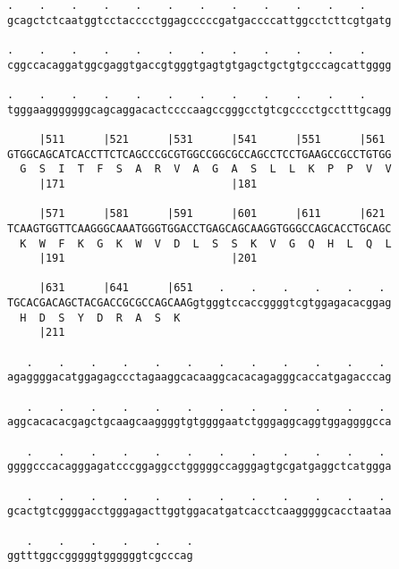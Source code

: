 \documentclass{article}
\begin{document}
\begin{Verbatim}
.    .    .    .    .    .    .    .    .    .    .    .    
gcagctctcaatggtcctacccctggagcccccgatgaccccattggcctcttcgtgatg
                                                            
.    .    .    .    .    .    .    .    .    .    .    .    
cggccacaggatggcgaggtgaccgtgggtgagtgtgagctgctgtgcccagcattgggg
                                                            
.    .    .    .    .    .    .    .    .    .    .    .    
tgggaagggggggcagcaggacactccccaagccgggcctgtcgcccctgcctttgcagg
                                                            
     |511      |521      |531      |541      |551      |561 
GTGGCAGCATCACCTTCTCAGCCCGCGTGGCCGGCGCCAGCCTCCTGAAGCCGCCTGTGG
  G  S  I  T  F  S  A  R  V  A  G  A  S  L  L  K  P  P  V  V
     |171                          |181                     
  
     |571      |581      |591      |601      |611      |621 
TCAAGTGGTTCAAGGGCAAATGGGTGGACCTGAGCAGCAAGGTGGGCCAGCACCTGCAGC
  K  W  F  K  G  K  W  V  D  L  S  S  K  V  G  Q  H  L  Q  L
     |191                          |201                     
  
     |631      |641      |651    .    .    .    .    .    . 
TGCACGACAGCTACGACCGCGCCAGCAAGgtgggtccaccggggtcgtggagacacggag
  H  D  S  Y  D  R  A  S  K                                 
     |211                                                   
  
   .    .    .    .    .    .    .    .    .    .    .    . 
agaggggacatggagagccctagaaggcacaaggcacacagagggcaccatgagacccag
                                                            
   .    .    .    .    .    .    .    .    .    .    .    . 
aggcacacacgagctgcaagcaaggggtgtggggaatctgggaggcaggtggaggggcca
                                                            
   .    .    .    .    .    .    .    .    .    .    .    . 
ggggcccacagggagatcccggaggcctgggggccagggagtgcgatgaggctcatggga
                                                            
   .    .    .    .    .    .    .    .    .    .    .    . 
gcactgtcggggacctgggagacttggtggacatgatcacctcaagggggcacctaataa
                                                            
   .    .    .    .    .    .
ggtttggccgggggtggggggtcgcccag
                             
                             
 

\end{Verbatim}
\end{document}
